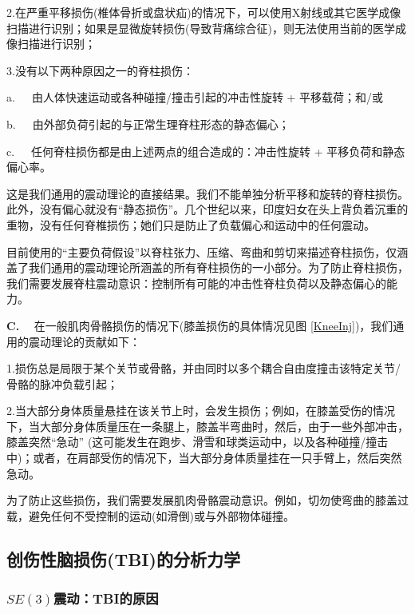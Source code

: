 \documentclass[11pt,fontset=founder]{ctexart}
\begin{document}
2.\quad 在严重平移损伤(椎体骨折或盘状疝)的情况下，可以使用X射线或其它医学成像扫描进行识别；如果是显微旋转损伤(导致背痛综合征)，则无法使用当前的医学成像扫描进行识别；

3.\quad 没有以下两种原因之一的脊柱损伤：

\qquad a.~~~由人体快速运动或各种碰撞/撞击引起的冲击性旋转 + 平移载荷；和/或

\qquad b.~~~由外部负荷引起的与正常生理脊柱形态的静态偏心；

\qquad c.~~~任何脊柱损伤都是由上述两点的组合造成的：冲击性旋转 + 平移负荷和静态偏心率。\newline

这是我们通用的震动理论的直接结果。我们不能单独分析平移和旋转的脊柱损伤。此外，没有偏心就没有“静态损伤”。几个世纪以来，印度妇女在头上背负着沉重的重物，没有任何脊椎损伤；她们只是防止了负载偏心和运动中的任何震动。\newline

目前使用的“主要负荷假设”以脊柱张力、压缩、弯曲和剪切来描述脊柱损伤，仅涵盖了我们通用的震动理论所涵盖的所有脊柱损伤的一小部分。为了防止脊柱损伤，我们需要发展脊柱震动意识：控制所有可能的冲击性脊柱负荷以及静态偏心的能力。%
\newline

\noindent\textbf{C.} ~~在一般肌肉骨骼损伤的情况下(膝盖损伤的具体情况见图 \ref{KneeInj})，我们通用的震动理论的贡献如下：\newline

1.\quad 损伤总是局限于某个关节或骨骼，并由同时以多个耦合自由度撞击该特定关节/骨骼的脉冲负载引起；

2.\quad 当大部分身体质量悬挂在该关节上时，会发生损伤；例如，在膝盖受伤的情况下，当大部分身体质量压在一条腿上，膝盖半弯曲时，然后，由于一些外部冲击，膝盖突然“急动” (这可能发生在跑步、滑雪和球类运动中，以及各种碰撞/撞击中)；或者，在肩部受伤的情况下，当大部分身体质量挂在一只手臂上，然后突然急动。\newline

为了防止这些损伤，我们需要发展肌肉骨骼震动意识。例如，切勿使弯曲的膝盖过载，避免任何不受控制的运动(如滑倒)或与外部物体碰撞。

\subsection{创伤性脑损伤(TBI)的分析力学}

\subsubsection{$SE(3)$震动：TBI的原因}
\end{document}
